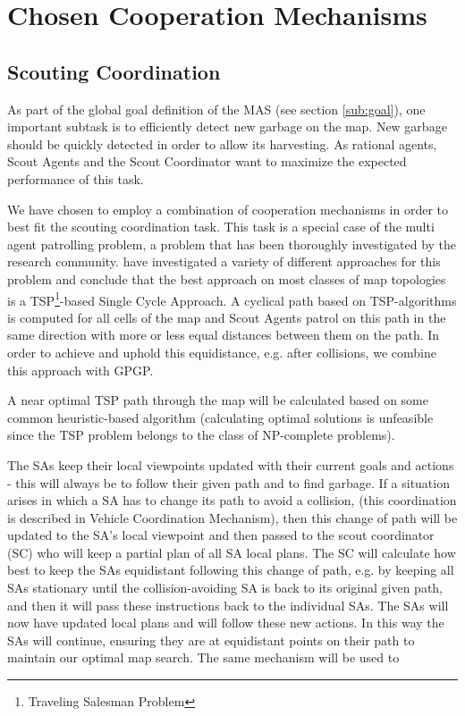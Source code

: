 \section{Chosen Cooperation Mechanisms}


\subsection{Scouting Coordination}

As part of the global goal definition of the MAS (see section \ref{sub:goal}), one important subtask is to efficiently detect new garbage on the map. New garbage should be quickly detected in order to allow its harvesting. As rational agents, Scout Agents and the Scout Coordinator want to maximize the expected performance of this task.

We have chosen to employ a combination of cooperation mechanisms in order to best fit the scouting coordination task. This task is a special case of the multi agent patrolling problem, a problem that has been thoroughly investigated by the research community. \cite{Almeida2004} have investigated a variety of different approaches for this problem and conclude that the best approach on most classes of map topologies is a TSP\footnote{Traveling Salesman Problem}-based Single Cycle Approach. A cyclical path based on TSP-algorithms is computed for all cells of the map and Scout Agents patrol on this path in the same direction with more or less equal distances between them on the path. In order to achieve and uphold this equidistance, e.g. after collisions, we combine this approach with GPGP.

A near optimal TSP path through the map will be calculated based on some common heuristic-based algorithm (calculating optimal solutions is unfeasible since the TSP problem belongs to the class of NP-complete problems).  


The SAs keep their local viewpoints updated with their current goals and actions - this will always be to follow their given path and to find garbage. If a situation arises in which a SA has to change its path to avoid a collision, (this coordination is described in Vehicle Coordination Mechanism), then this change of path will be updated to the SA’s local viewpoint and then passed to the scout coordinator (SC) who will keep a partial plan of all SA local plans. The SC will calculate how best to keep the SAs equidistant following this change of path, e.g. by keeping all SAs stationary until the collision-avoiding SA is back to its original given path, and then it will pass these instructions back to the individual SAs. The SAs will now have updated local plans and will follow these new actions. In this way the SAs will continue, ensuring they are at equidistant points on their path to maintain our optimal map search. The same mechanism will be used to 
  


